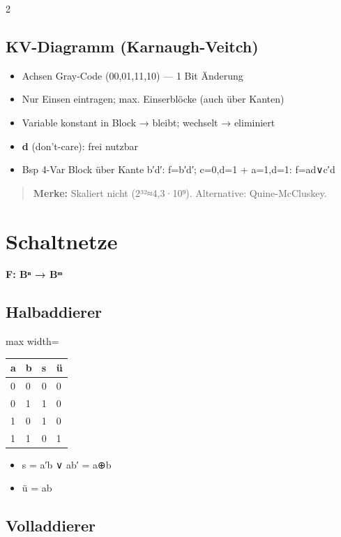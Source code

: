 \documentclass[10pt, a4paper]{article}
\begin{document}
\begin{multicols}{2}
\subsection{KV-Diagramm (Karnaugh-Veitch)}
\begin{itemize}
  \item Achsen Gray-Code (00,01,11,10) — 1 Bit Änderung
  \item Nur Einsen eintragen; max. Einserblöcke (auch über Kanten)
  \item Variable konstant in Block → bleibt; wechselt → eliminiert
  \item \textbf{d} (don't-care): frei nutzbar
  \item Bsp 4-Var Block über Kante b′d′: f=b′d′; c=0,d=1 + a=1,d=1: f=ad∨c′d
\end{itemize}

\begin{quote}
\textbf{Merke:} Skaliert nicht (2³²≈4,3·10⁹). Alternative: Quine-McCluskey.
\end{quote}


\section{Schaltnetze}

\textbf{F: Bⁿ → Bᵐ}



\subsection{Halbaddierer}

{\small
\begin{adjustbox}{max width=\linewidth}
{\scriptsize
\begin{tabular}{llll}
\toprule
\textbf{a} & \textbf{b} & \textbf{s} & \textbf{ü} \\
\midrule
0 & 0 & 0 & 0 \\
0 & 1 & 1 & 0 \\
1 & 0 & 1 & 0 \\
1 & 1 & 0 & 1 \\
\bottomrule
\end{tabular}
}
\end{adjustbox}
}


\begin{itemize}
  \item s = a′b ∨ ab′ = a⊕b
  \item ü = ab
\end{itemize}


\subsection{Volladdierer}


\end{multicols}
\end{document}
